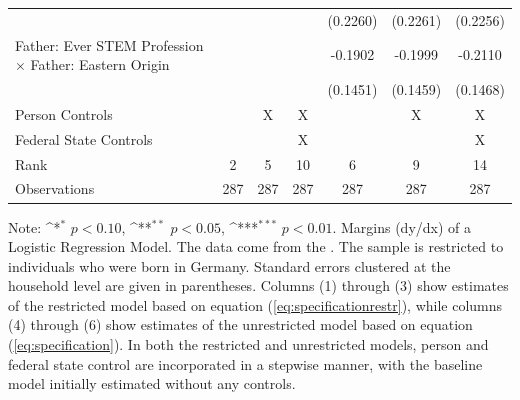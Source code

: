 \documentclass[a4paper, oneside, hyperfootnotes = false]{article}
\def\sym#1{\ifmmode^{#1}\else\(^{#1}\)\fi}
\begin{document}
{\begin{landscape}
\begin{table}[ht]
\begin{center}
{\begin{tabular}{l*{6}{c}}
					&                     &                     &                     &    (0.2260)         &    (0.2261)         &    (0.2256)         \\
					\addlinespace
					Father: Ever STEM Profession $\times$ Father: Eastern Origin&                     &                     &                     &     -0.1902         &     -0.1999         &     -0.2110         \\
					&                     &                     &                     &    (0.1451)         &    (0.1459)         &    (0.1468)         \\
					\midrule
					Person Controls & & X  & X & & X & X \\
					Federal State Controls & & & X & & & X \\
					Rank                &      2         &      5         &     10         &      6         &      9         &     14         \\
					Observations &    287         &    287         &    287         &    287         &    287         &    287         \\
					\bottomrule
			\end{tabular}}
			
			\vspace{2mm}
			
			\parbox{15cm}{
				\linespread{1}\footnotesize Note: \sym{*} \(p<0.10\), \sym{**} \(p<0.05\), \sym{***} \(p<0.01\). Margins (dy/dx) of a Logistic Regression Model. The data come from the \cite{SOEP2023}. The sample is restricted to individuals who were born in Germany. Standard errors clustered at the household level are given in parentheses. Columns (1) through (3) show estimates of the restricted model based on equation (\ref{eq:specificationrestr}), while columns (4) through (6) show estimates of the unrestricted model based on equation (\ref{eq:specification}). In both the restricted and unrestricted models, person and federal state control are incorporated in a stepwise manner, with the baseline model initially estimated without any controls.}
			
		\end{center}
	\end{table}
\end{landscape}

}
\end{document}
